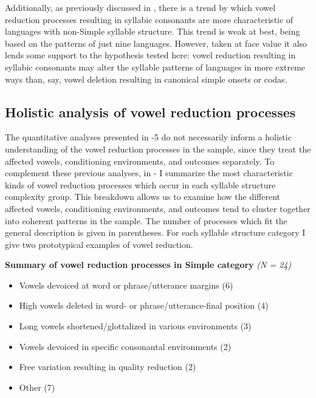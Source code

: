   Additionally, as previously discussed in , there is a trend by which vowel reduction processes resulting in syllabic consonants are more characteristic of languages with non-Simple syllable structure. This trend is weak at best, being based on the patterns of just nine languages. However, taken at face value it also lends some support to the hypothesis tested here: vowel reduction resulting in syllabic consonants may alter the syllable patterns of languages in more extreme ways than, say, vowel deletion resulting in canonical simple onsets or codas.

\subsection{Holistic analysis of vowel reduction processes}\label{sec:6.3.6}

  The quantitative analyses presented in -5 do not necessarily inform a holistic understanding of the vowel reduction processes in the sample, since they treat the affected vowels, conditioning environments, and outcomes separately. To complement these previous analyses, in - I summarize the most characteristic kinds of vowel reduction processes which occur in each syllable structure complexity group. This breakdown allows us to examine how the different affected vowels, conditioning environments, and outcomes tend to cluster together into coherent patterns in the sample. The number of processes which fit the general description is given in parentheses. For each syllable structure category I give two prototypical examples of vowel reduction.

\ea\label{ex:6.16}
  \textbf{Summary of vowel reduction processes in Simple category} \textit{(N = 24)}

\begin{itemize}
\item Vowels devoiced at word or phrase/utterance margins {(6)}
\item High vowels deleted in word- or phrase/utterance-final position {(4)}
\item Long vowels shortened/glottalized in various environments {(3)}
\item Vowels devoiced in specific consonantal environments {(2)}
\item Free variation resulting in quality reduction {(2)}
\item Other {(7)}
\end{itemize}


